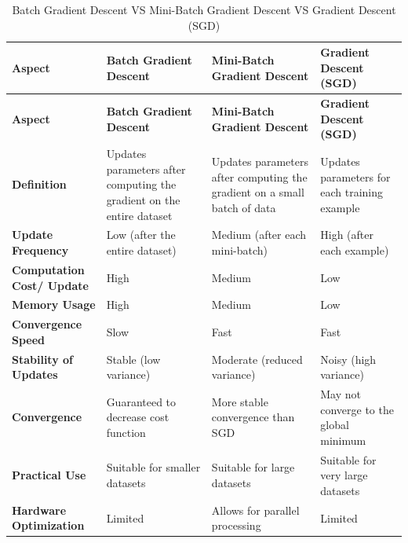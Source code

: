 \begin{longtable}{|p{2.5cm}|p{4cm}|p{3.5cm}|p{3.5cm}|}
    \caption{
    Batch Gradient Descent 
    VS 
    Mini-Batch Gradient Descent
    VS 
    Gradient Descent (SGD) 
    }\\
    
    \hline
    \textbf{Aspect} & \textbf{Batch Gradient Descent} & \textbf{Mini-Batch Gradient Descent} & \textbf{Gradient Descent (SGD)} \\
    \hline
    \endfirsthead
    
    \hline
    \textbf{Aspect} & \textbf{Batch Gradient Descent} & \textbf{Mini-Batch Gradient Descent} & \textbf{Gradient Descent (SGD)} \\
    \hline
    \endhead
    
    \hline\endfoot
    \hline\endlastfoot
    
    \textbf{Definition} & Updates parameters after computing the gradient on the entire dataset & Updates parameters after computing the gradient on a small batch of data & Updates parameters for each training example \\
    \hline

    \textbf{Update Frequency} & Low (after the entire dataset) & Medium (after each mini-batch) & High (after each example) \\
    \hline
    
    \textbf{Computation Cost/ Update} & High & Medium & Low \\
    \hline
    
    \textbf{Memory Usage} & High & Medium & Low \\
    \hline
    
    \textbf{Convergence Speed} & Slow & Fast & Fast \\
    \hline
    
    \textbf{Stability of Updates} & Stable (low variance) & Moderate (reduced variance) & Noisy (high variance) \\
    \hline
    
    \textbf{Convergence} & Guaranteed to decrease cost function & More stable convergence than SGD & May not converge to the global minimum \\
    \hline
    
    \textbf{Practical Use} & Suitable for smaller datasets & Suitable for large datasets & Suitable for very large datasets \\
    \hline
    
    \textbf{Hardware Optimization} & Limited & Allows for parallel processing & Limited \\
    \hline
    

\end{longtable}
